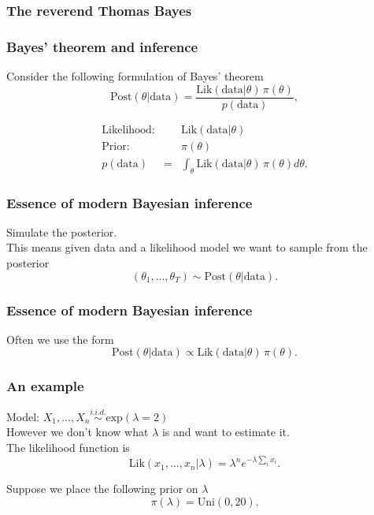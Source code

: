 \begin{frame}[fragile]\frametitle{The reverend Thomas Bayes}
\end{frame}


\begin{frame}[fragile]\frametitle{Bayes' theorem and inference}

Consider the following formulation of Bayes' theorem
$$\mbox{Post}(\theta|\mbox{data}) =
\frac{\mbox{Lik}(\mbox{data}|\theta) \,
  \pi(\theta)}{p(\mbox{data})},$$ 

\begin{eqnarray*}
\mbox{Likelihood:} & & \mbox{Lik}(\mbox{data}|\theta) \\ 
\mbox{Prior:} & & \pi(\theta)\\   
p(\mbox{data}) &=& \int_\theta \mbox{Lik}(\mbox{data}|\theta) \,
  \pi(\theta) d\theta.
\end{eqnarray*}
\end{frame}


\begin{frame}[fragile]\frametitle{Essence of modern Bayesian inference}

Simulate the posterior. \\ 
This means given data and a likelihood model
we want to sample from the posterior \\
$$(\theta_1,...,\theta_T) \sim \mbox{Post}(\theta|\mbox{data}).$$

\end{frame}

\begin{frame}[fragile]\frametitle{Essence of modern Bayesian inference}

Often we use the form
$$\mbox{Post}(\theta|\mbox{data}) \propto \mbox{Lik}(\mbox{data}|\theta) \,
  \pi(\theta).$$ 

\end{frame}


\begin{frame}[fragile]\frametitle{An example}

Model: $X_1,...,X_n \stackrel{i.i.d.}{\sim} \mbox{exp}(\lambda=2)$ \\ 
However we don't know what $\lambda$ is and want to estimate it. \\ 

The likelihood function is
$$\mbox{Lik}(x_1,...,x_n|\lambda) = \lambda^n e^{-\lambda \sum_i
  x_i}.$$ 

Suppose we place the following prior on $\lambda$ 
$$\pi(\lambda) = \mbox{Uni}(0,20).$$

\end{frame}

